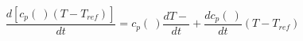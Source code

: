 \begin{equation}
\frac{d [c_p(\ ) (T-T_{ref})]}{dt} =c_p(\ ) \frac{d T- }{dt} + \frac{d c_p(\ )}{dt} (T- T_{ref})
\end{equation}